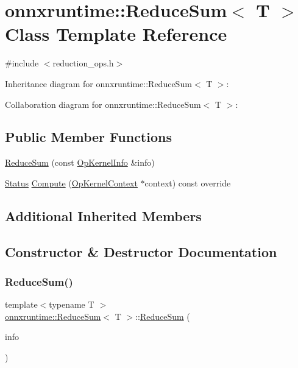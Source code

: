 \hypertarget{classonnxruntime_1_1ReduceSum}{}\section{onnxruntime\+:\+:Reduce\+Sum$<$ T $>$ Class Template Reference}
\label{classonnxruntime_1_1ReduceSum}


{\ttfamily \#include $<$reduction\+\_\+ops.\+h$>$}



Inheritance diagram for onnxruntime\+:\+:Reduce\+Sum$<$ T $>$\+:


Collaboration diagram for onnxruntime\+:\+:Reduce\+Sum$<$ T $>$\+:
\subsection*{Public Member Functions}
\begin{DoxyCompactItemize}
\item 
\mbox{\hyperlink{classonnxruntime_1_1ReduceSum_a6e19784a65f3c551f67fbea756ec299b}{Reduce\+Sum}} (const \mbox{\hyperlink{classonnxruntime_1_1OpKernelInfo}{Op\+Kernel\+Info}} \&info)
\item 
\mbox{\hyperlink{classonnxruntime_1_1common_1_1Status}{Status}} \mbox{\hyperlink{classonnxruntime_1_1ReduceSum_a743af6e8784f94fe032a68ef10de3a41}{Compute}} (\mbox{\hyperlink{classonnxruntime_1_1OpKernelContext}{Op\+Kernel\+Context}} $\ast$context) const override
\end{DoxyCompactItemize}
\subsection*{Additional Inherited Members}


\subsection{Constructor \& Destructor Documentation}
\mbox{\label{classonnxruntime_1_1ReduceSum_a6e19784a65f3c551f67fbea756ec299b}} 
\subsubsection{\texorpdfstring{Reduce\+Sum()}{ReduceSum()}}
{\footnotesize\ttfamily template$<$typename T $>$ \\
\mbox{\hyperlink{classonnxruntime_1_1ReduceSum}{onnxruntime\+::\+Reduce\+Sum}}$<$ T $>$\+::\mbox{\hyperlink{classonnxruntime_1_1ReduceSum}{Reduce\+Sum}} (\begin{DoxyParamCaption}\item[{const \mbox{\hyperlink{classonnxruntime_1_1OpKernelInfo}{Op\+Kernel\+Info}} \&}]{info }\end{DoxyParamCaption})\hspace{0.3cm}{\ttfamily [inline]}}



